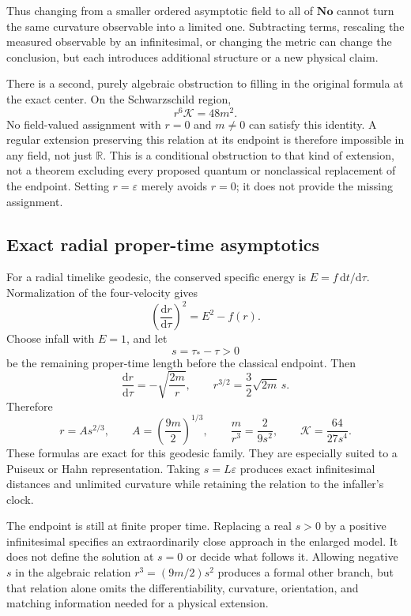 \documentclass[11pt,letterpaper]{article}
\newcommand{\No}{\mathbf{No}}
\newcommand{\R}{\mathbb{R}}
\newcommand{\eps}{\varepsilon}
\newcommand{\dd}{\mathrm{d}}
\newcommand{\Kretsch}{\mathcal K}
\theoremstyle{definition}
\theoremstyle{remark}
\begin{document}
Thus changing from a smaller ordered asymptotic field to all of $\No$ cannot
turn the same curvature observable into a limited one. Subtracting terms,
rescaling the measured observable by an infinitesimal, or changing the metric
can change the conclusion, but each introduces additional structure or a new
physical claim.

There is a second, purely algebraic obstruction to filling in the original
formula at the exact center. On the Schwarzschild region,
\begin{equation}
 r^6\Kretsch=48m^2.
 \label{eq:polyobstruction}
\end{equation}
No field-valued assignment with $r=0$ and $m\ne0$ can satisfy this identity.
A regular extension preserving this relation at its endpoint is therefore
impossible in any field, not just $\R$. This is a conditional obstruction to
that kind of extension, not a theorem excluding every proposed quantum or
nonclassical replacement of the endpoint. Setting $r=\eps$ merely avoids
$r=0$; it does not provide the missing assignment.

\subsection{Exact radial proper-time asymptotics}

For a radial timelike geodesic, the conserved specific energy is
$E=f\,\dd t/\dd\tau$. Normalization of the four-velocity gives
\[
 \left(\frac{\dd r}{\dd\tau}\right)^2=E^2-f(r).
\]
Choose infall with $E=1$, and let
\[
 s=\tau_*-\tau>0
\]
be the remaining proper-time length before the classical endpoint. Then
\[
 \frac{\dd r}{\dd\tau}=-\sqrt{\frac{2m}{r}},
 \qquad
 r^{3/2}=\frac32\sqrt{2m}\,s.
\]
Therefore
\begin{equation}
 r=A s^{2/3},\qquad A=\left(\frac{9m}{2}\right)^{1/3},
 \qquad
 \frac{m}{r^3}=\frac{2}{9s^2},\qquad
 \Kretsch=\frac{64}{27s^4}.
 \label{eq:radial}
\end{equation}
These formulas are exact for this geodesic family. They are especially suited
to a Puiseux or Hahn representation. Taking $s=L\eps$ produces exact
infinitesimal distances and unlimited curvature while retaining the relation
to the infaller's clock.

The endpoint is still at finite proper time. Replacing a real $s>0$ by a
positive infinitesimal specifies an extraordinarily close approach in the
enlarged model. It does not define the solution at $s=0$ or decide what follows
it. Allowing negative $s$ in the algebraic relation
$r^3=(9m/2)s^2$ produces a formal other branch, but that relation alone omits
the differentiability, curvature, orientation, and matching information needed
for a physical extension.
\end{document}
